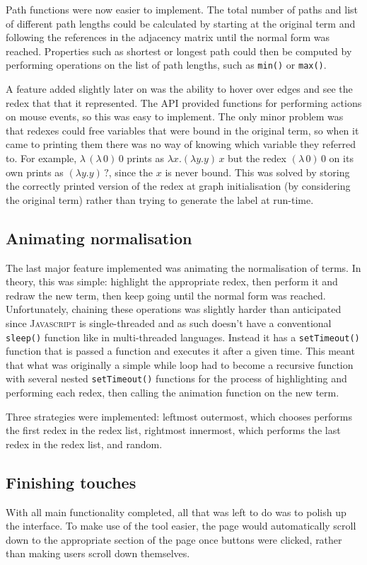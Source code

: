 \documentclass[11pt]{article}
\begin{document}
Path functions were now easier to implement. The total number of paths and list of different path lengths could be calculated by starting at the original term and following the references in the adjacency matrix until the normal form was reached. Properties such as shortest or longest path could then be computed by performing operations on the list of path lengths, such as \texttt{min()} or \texttt{max()}.

A feature added slightly later on was the ability to hover over edges and see the redex that that it represented. The API provided functions for performing actions on mouse events, so this was easy to implement. The only minor problem was that redexes could free variables that were bound in the original term, so when it came to printing them there was no way of knowing which variable they referred to. For example, $\lambda \, (\lambda \, 0) \, 0$ prints as $\lambda x. (\lambda y. y) \, x$ but the redex $(\lambda \, 0) \, 0$ on its own prints as $(\lambda y. y) \, ?$, since the $x$ is never bound. This was solved by storing the correctly printed version of the redex at graph initialisation (by considering the original term) rather than trying to generate the label at run-time.

\subsection{Animating normalisation}
The last major feature implemented was animating the normalisation of terms. In theory, this was simple: highlight the appropriate redex, then perform it and redraw the new term, then keep going until the normal form was reached. Unfortunately, chaining these operations was slightly harder than anticipated since \textsc{Javascript} is single-threaded and as such doesn't have a conventional \texttt{sleep()} function like in multi-threaded languages. Instead it has a \texttt{setTimeout()} function that is passed a function and executes it after a given time. This meant that what was originally a simple while loop had to become a recursive function with several nested \texttt{setTimeout()} functions for the process of highlighting and performing each redex, then calling the animation function on the new term.

Three strategies were implemented: leftmost outermost, which chooses performs the first redex in the redex list, rightmost innermost, which performs the last redex in the redex list, and random.

\subsection{Finishing touches}
With all main functionality completed, all that was left to do was to polish up the interface. To make use of the tool easier, the page would automatically scroll down to the appropriate section of the page once buttons were clicked, rather than making users scroll down themselves. 
\end{document}
